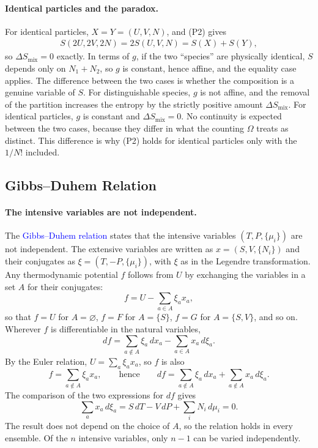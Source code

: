\paragraph{Identical particles and the paradox.}
For identical particles, $X=Y=(U,V,N)$, and (P2) gives
\begin{align*}
    S(2U,2V,2N)=2S(U,V,N)=S(X)+S(Y),
\end{align*}
so $\Delta S_{\mathrm{mix}}=0$ exactly. In terms of $g$, if the two
``species'' are physically identical, $S$ depends only on $N_1+N_2$, so $g$
is constant, hence affine, and the equality case applies. The difference
between the two cases is whether the composition is a genuine variable of
$S$. For distinguishable species, $g$ is not affine, and the removal of the
partition increases the entropy by the strictly positive amount
$\Delta S_{\mathrm{mix}}$. For identical particles, $g$ is constant and
$\Delta S_{\mathrm{mix}}=0$. No continuity is expected between the two
cases, because they differ in what the counting $\Omega$ treats as
distinct. This difference is why (P2) holds for identical particles only
with the $1/N!$ included.

\subsection{Gibbs--Duhem Relation}

\paragraph{The intensive variables are not independent.}
The \textcolor{blue}{Gibbs--Duhem relation} states that the intensive
variables $(T,P,\{\mu_i\})$ are not independent. The extensive variables are
written as $x=(S,V,\{N_i\})$ and their conjugates as
$\xi=(T,-P,\{\mu_i\})$, with $\xi$ as in the Legendre transformation. Any
thermodynamic potential $f$ follows from $U$ by exchanging the variables in a
set $A$ for their conjugates:
\begin{equation*}
    f=U-\sum_{a\in A}\xi_a x_a,
\end{equation*}
so that $f=U$ for $A=\varnothing$, $f=F$ for $A=\{S\}$, $f=G$ for
$A=\{S,V\}$, and so on. Wherever $f$ is differentiable in the natural
variables,
\begin{equation*}
    df=\sum_{a\notin A}\xi_a\,dx_a-\sum_{a\in A}x_a\,d\xi_a.
\end{equation*}
By the Euler relation, $U=\sum_a\xi_a x_a$, so $f$ is also
\begin{equation*}
    f=\sum_{a\notin A}\xi_a x_a,
    \qquad\text{hence}\qquad
    df=\sum_{a\notin A}\xi_a\,dx_a+\sum_{a\notin A}x_a\,d\xi_a.
\end{equation*}
The comparison of the two expressions for $df$ gives
\begin{equation}
    \boxed{\sum_a x_a\,d\xi_a=S\,dT-V\,dP+\sum_i N_i\,d\mu_i=0.}
\end{equation}
The result does not depend on the choice of $A$, so the relation holds in
every ensemble. Of the $n$ intensive variables, only $n-1$ can be varied
independently.


